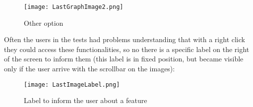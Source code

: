 \begin{figure}[H]
\centering
\texttt{[image: LastGraphImage2.png]} 
\caption{Other option}
\end{figure}  

Often the users in the tests had problems understanding that with a right click they could access these functionalities, so no there is a specific label on the right of the screen to inform them (this label is in fixed position, but became visible only if the user arrive with the scrollbar on the images):

\begin{figure}[H]
\centering
\texttt{[image: LastImageLabel.png]} 
\caption{Label to inform the user about a feature}
\end{figure} 

